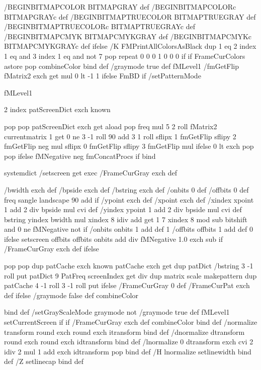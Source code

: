 	{
	/BEGINBITMAPCOLOR { 
		BITMAPGRAY} def
	/BEGINBITMAPCOLORc { 
		BITMAPGRAYc} def
	/BEGINBITMAPTRUECOLOR { 
		BITMAPTRUEGRAY } def
	/BEGINBITMAPTRUECOLORc { 
		BITMAPTRUEGRAYc } def
	/BEGINBITMAPCMYK { 
		BITMAPCMYKGRAY } def
	/BEGINBITMAPCMYKc { 
		BITMAPCMYKGRAYc } def
	}
ifelse
/K { 
	FMPrintAllColorsAsBlack {
		dup 1 eq 2 index 1 eq and 3 index 1 eq and not
			{7 {pop} repeat 0 0 0 1 0 0 0} if
	} if 
	FrameCurColors astore 
	pop combineColor
} bind def
/graymode true def
fMLevel1 {
	/fmGetFlip {
		fMatrix2 exch get mul 0 lt { -1 } { 1 } ifelse
	} FmBD
} if
/setPatternMode {
	fMLevel1 {
		2 index patScreenDict exch known {
			pop pop
			patScreenDict exch get aload pop 
			freq 								
			mul									
			5 2 roll							
			fMatrix2 currentmatrix 1 get 0 ne {
				3 -1 roll 90 add 3 1 roll 		
				sflipx 1 fmGetFlip sflipy 2 fmGetFlip neg mul
			} {  								
				sflipx 0 fmGetFlip sflipy 3 fmGetFlip mul 
			} ifelse
			0 lt {exch pop} {pop} ifelse 		
			fMNegative { 
				{neg} fmConcatProcs 			
			} if
			bind
			
			
			
			systemdict /setscreen get exec		
			/FrameCurGray exch def
		} {
			/bwidth  exch def
			/bpside  exch def
			/bstring exch def
			/onbits 0 def  /offbits 0 def
			freq sangle landscape {90 add} if 
				{/ypoint exch def
				 /xpoint exch def
				 /xindex xpoint 1 add 2 div bpside mul cvi def
				 /yindex ypoint 1 add 2 div bpside mul cvi def
				 bstring yindex bwidth mul xindex 8 idiv add get
				 1 7 xindex 8 mod sub bitshift and 0 ne fMNegative {not} if
				 {/onbits  onbits  1 add def 1}
				 {/offbits offbits 1 add def 0}
				 ifelse
				}
				setscreen
			offbits offbits onbits add div fMNegative {1.0 exch sub} if
			/FrameCurGray exch def
		} ifelse
	} { 
		pop pop
		dup patCache exch known {
			patCache exch get
		} { 
			dup
			patDict /bstring 3 -1 roll put
			patDict 
			9 PatFreq screenIndex get div dup matrix scale
			makepattern
			dup 
			patCache 4 -1 roll 3 -1 roll put
		} ifelse
		/FrameCurGray 0 def
		/FrameCurPat exch def
	} ifelse
	/graymode false def
	combineColor
} bind def
/setGrayScaleMode {
	graymode not {
		/graymode true def
		fMLevel1 {
			setCurrentScreen
		} if
	} if
	/FrameCurGray exch def
	combineColor
} bind def
/normalize {
	transform round exch round exch itransform
	} bind def
/dnormalize {
	dtransform round exch round exch idtransform
	} bind def
/lnormalize { 
	0 dtransform exch cvi 2 idiv 2 mul 1 add exch idtransform pop
	} bind def
/H { 
	lnormalize setlinewidth
	} bind def
/Z {
	setlinecap
	} bind def
	
